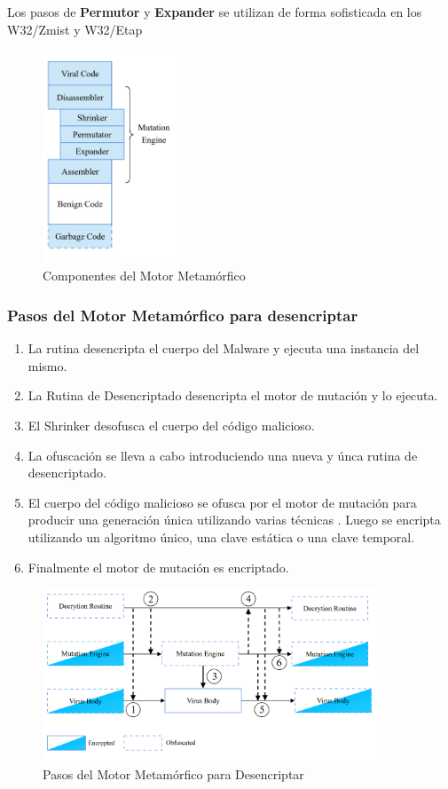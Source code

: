 \documentclass[15pt]{article}
\begin{document}
	Los pasos de \textbf{Permutor} y \textbf{Expander} se utilizan de forma sofisticada en los W32/Zmist \cite{zmist} y W32/Etap \cite{etap}
	
	\begin{figure}[H]
		\centering
		\includegraphics[width=4cm]{images/metamorphic.png}
		\caption{Componentes del Motor Metamórfico}
	\end{figure}

	\subsubsection{Pasos del Motor Metamórfico para desencriptar}
	\begin{enumerate}
		\item La rutina desencripta el cuerpo del Malware y ejecuta una instancia del mismo.
		\item La Rutina de Desencriptado desencripta el motor de mutación y lo ejecuta.
		\item El Shrinker desofusca el cuerpo del código malicioso.
		\item La ofuscación se lleva a cabo introduciendo una nueva y únca rutina de desencriptado.
		\item El cuerpo del código malicioso se ofusca por el motor de mutación para producir una generación única utilizando varias técnicas . Luego se encripta utilizando un algoritmo único, una clave estática o una clave temporal.
		\item Finalmente el motor de mutación es encriptado.
	\end{enumerate}

	\begin{figure}[H]
		\centering
		\includegraphics[width=10cm]{images/steps_metamorphic.png}
		\caption{Pasos del Motor Metamórfico para Desencriptar}
	\end{figure}
	
\end{document}
